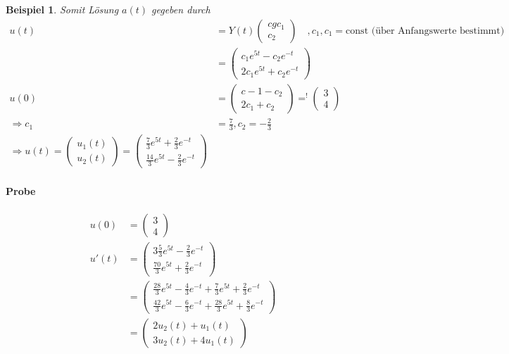 \documentclass[11pt]{article}
\newcounter{myCounter}[section]
\newtheorem{Bsp}[myCounter]{Beispiel}
\begin{document}
\begin{Bsp}
  Somit L\"osung $a(t)$ gegeben durch
  \begin{align*}
    u(t) &= Y(t) \begin{pmatrix} cgc_1 \\ c_2 \end{pmatrix} \quad, c_1, c_1 = \text{const
      (\"uber Anfangswerte bestimmt)} \\
      &= \begin{pmatrix} c_1 e^{5t} - c_2 e^{-t} \\ 2c_1e^{5t} + c_2e^{-t}
    \end{pmatrix} \\
  u(0) &= \begin{pmatrix} c-1 - c_2 \\ 2 c_1 + c_2 \end{pmatrix} \mathop{=}^!
  \begin{pmatrix} 3 \\ 4 \end{pmatrix} \\
    \Rightarrow c_1 &= \frac{7}{3}, c_2 = - \frac{2}{3} \\
\Rightarrow u(t) = \begin{pmatrix} u_1(t) \\ u_2(t) \end{pmatrix} =
  \begin{pmatrix} \frac{7}{3} e^{5t} + \frac{2}{3} e^{-t} \\ \frac{14}{3} e^{5t}
  - \frac{2}{3} e^{-t} \end{pmatrix}
  \end{align*}
  \paragraph{Probe}
  \begin{align*}
    u(0) &= \begin{pmatrix} 3 \\ 4 \end{pmatrix} \\
  u'(t) &= \begin{pmatrix} 3 \frac{5}{3} e^{5t} - \frac{2}{3} e^{-t} \\
  \frac{70}{3} e^{5t} + \frac{2}{3} e^{-t} \end{pmatrix} \\
&= \begin{pmatrix} \frac{28}{3} e^{5t} - \frac{4}{3} e^{-t} + \frac{7}{3} e^{5t}
+ \frac{2}{3} e^{-t} \\ \frac{42}{3} e^{5t} - \frac{6}{3} e^{-t} + \frac{28}{3}
e^{5t} + \frac{8}{3} e^{-t} \end{pmatrix} \\
&= \begin{pmatrix} 2 u_2(t) + u_1(t) \\ 3 u_2(t) + 4 u_1(t) \end{pmatrix}
  \end{align*}
\end{Bsp}
\end{document}

